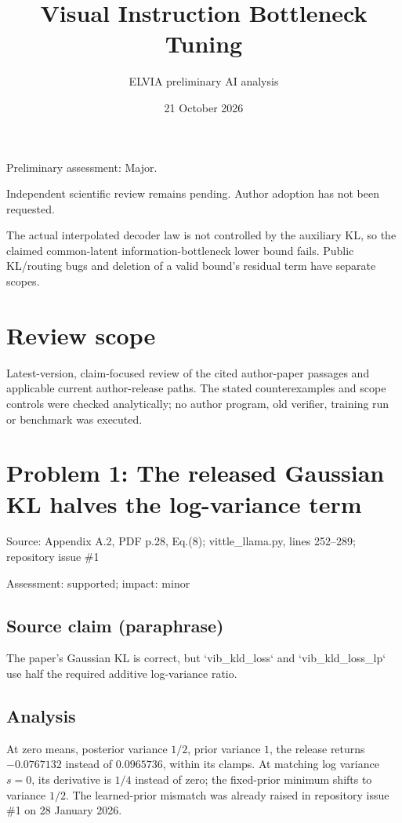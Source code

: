 \documentclass[11pt]{article}
\begin{document}
\title{Visual Instruction Bottleneck Tuning}

\author{ELVIA preliminary AI analysis}\date{21 October 2026}\maketitle

Preliminary assessment: Major.\par

Independent scientific review remains pending. Author adoption has not been requested.

The actual interpolated decoder law is not controlled by the auxiliary KL, so the claimed common-latent information-bottleneck lower bound fails. Public KL/routing bugs and deletion of a valid bound’s residual term have separate scopes.

\section*{Review scope}

Latest-version, claim-focused review of the cited author-paper passages and applicable current author-release paths. The stated counterexamples and scope controls were checked analytically; no author program, old verifier, training run or benchmark was executed.

\section*{Problem 1: The released Gaussian KL halves the log-variance term}

Source: Appendix A.2, PDF p.28, Eq.(8); vittle\_llama.py, lines 252–289; repository issue \#1

Assessment: supported; impact: minor

\subsection*{Source claim (paraphrase)}

The paper’s Gaussian KL is correct, but `vib\_kld\_loss` and `vib\_kld\_loss\_lp` use half the required additive log-variance ratio.

\subsection*{Analysis}

At zero means, posterior variance \(1/2\), prior variance \(1\), the release returns \(-0.0767132\) instead of \(0.0965736\), within its clamps. At matching log variance \(s=0\), its derivative is \(1/4\) instead of zero; the fixed-prior minimum shifts to variance \(1/2\). The learned-prior mismatch was already raised in repository issue \#1 on 28 January 2026.
\end{document}
